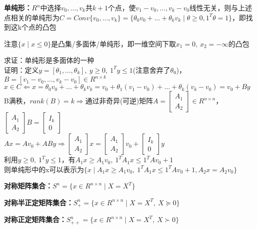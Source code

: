 \documentclass[11pt]{ctexart}         %
\begin{document}
\textbf{单纯形：}$R^n$中选择$v_0,\dots,v_k$共$k+1$个点，使$v_1-v_0,\dots,v_k-v_0$线性无关，则与上述点相关的单纯形为$C=Conv\{v_0,\dots,v_k\}=\{\theta_0v_0+\dots+\theta_kv_k\mid \theta\geq 0,1^T\theta =1\}$，即找到这k个点的凸包

注意$\{x\mid x\leq 0\}$是凸集/多面体/单纯形，即一维空间下取$x_1=0,\ x_2=-\infty$的凸包

\pagebreak
求证：单纯形是多面体的一种\\
证明：定义$y=[\theta_1,\dots,\theta_k],\ y\geq 0,\ 1^Ty\leq 1$(注意舍弃了$\theta_0$)，$B=[v_1-v_0,\dots,v_k-v_0]\in R^{n\times k}$\\
\phantom{证明：}$x\in C\Leftarrow x=\theta_0v_0+\dots+\theta_kv_k=v_0+\theta_1(v_1-v_0)+\dots+\theta_k(v_k-v_0)=v_0+By$\\[8pt]
\phantom{证明：}B满秩，$rank(B)=k\Rightarrow$通过非奇异(可逆)矩阵$A=\left[\begin{array}{c}A_1\\A_2\end{array}\right]\in R^{n\times n}$，$\left[\begin{array}{c}A_1\\A_2\end{array}\right]B=\left[\begin{array}{c}I_k\\0\end{array}\right]$\\
\phantom{证明：}$Ax=Av_0+ABy\Rightarrow\left[\begin{array}{c}A_1\\A_2\end{array}\right]x=\left[\begin{array}{c}A_1\\A_2\end{array}\right]v_0+\left[\begin{array}{c}I_k\\0\end{array}\right]y$\\[8pt]
\phantom{证明：}利用$y\geq 0,\ 1^Ty\leq 1$，有$A_1x\geq A_1v_0,\ 1^TA_1x\leq 1^TAv_0+1$\\
\phantom{证明：}则单纯形中的x可以表示为$\{x\mid A_1x\geq A_1v_0,\ 1^TA_1x\leq 1^TAv_0+1,A_2x=A_2v_0\}$

\textbf{对称矩阵集合：}$S^n=\{x\in R^{n\times n}\mid X=X^T\}$

\textbf{对称半正定矩阵集合：}$S^n_{+}=\{x\in R^{n\times n}\mid X=X^T,\ X\succeq 0\}$

\textbf{对称正定矩阵集合：}$S^n_{++}=\{x\in R^{n\times n}\mid X=X^T,\ X\succ 0\}$
\end{document}
